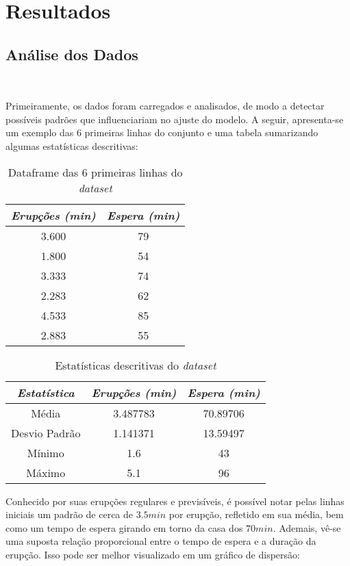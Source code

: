 \documentclass[12pt]{article}
\begin{document}
\section{Resultados}

\subsection{Análise dos Dados}

\

Primeiramente, os dados foram carregados e analisados, de modo a detectar possíveis padrões que influenciariam no ajuste do modelo. A seguir, apresenta-se um exemplo das 6 primeiras linhas do conjunto e uma tabela sumarizando algumas estatísticas descritivas:

\begin{table}[H]
\centering
\begin{tabular}{cc}
\hline
\textit{Erupções (min)} & \textit{Espera (min)} \\
\hline
3.600 & 79 \\
1.800 & 54 \\
3.333 & 74 \\
2.283 & 62 \\
4.533 & 85 \\
2.883 & 55 \\
\hline
\end{tabular}
\caption{Dataframe das 6 primeiras linhas do \textit{dataset}}
\end{table}

\begin{table}[H]
\centering
\begin{tabular}{ccc}
\hline
\textit{Estatística} & \textit{Erupções (min)} & \textit{Espera (min)} \\
\hline
Média & 3.487783 & 70.89706 \\
Desvio Padrão & 1.141371 & 13.59497 \\
Mínimo & 1.6 & 43 \\
Máximo & 5.1 & 96 \\
\hline
\end{tabular}
\caption{Estatísticas descritivas do \textit{dataset}}
\end{table}

Conhecido por suas erupções regulares e previsíveis, é possível notar pelas linhas iniciais um padrão de cerca de $3.5 min$ por erupção, refletido em sua média, bem como um tempo de espera girando em torno da casa dos $70 min$. Ademais, vê-se uma suposta relação proporcional entre o tempo de espera e a duração da erupção. Isso pode ser melhor visualizado em um gráfico de dispersão:
\end{document}
